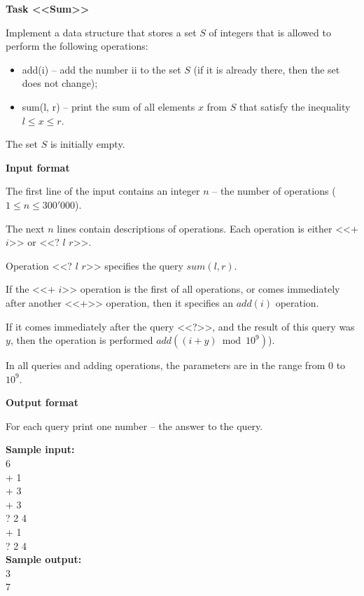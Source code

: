 \documentclass[a4paper]{article}
\begin{document}
\textbf{Task <<Sum>>}

Implement a data structure that stores a set $S$ of integers that is allowed to perform the following operations:
\begin{itemize}
\item add(i) -- add the number ii to the set $S$ (if it is already there, then the set does not change);
\item sum(l, r) -- print the sum of all elements $x$ from $S$ that satisfy the inequality $l \le x \le r$.
\end{itemize}

The set $S$ is initially empty.

\SPACE

\textbf{Input format}

The first line of the input contains an integer $n$ -- the number of operations ($1 \le n \le 300'000$).

The next $n$ lines contain descriptions of operations. Each operation is either <<+ $i$>> or <<? $l$ $r$>>.

Operation <<? $l$ $r$>> specifies the query $sum(l, r)$.

If the <<+ $i$>> operation is the first of all operations, or comes immediately after another <<+>> operation, then it specifies an $add(i)$ operation.

If it comes immediately after the query <<?>>, and the result of this query was $y$, then the operation is performed $add ((i + y) \bmod 10^9)$).

In all queries and adding operations, the parameters are in the range from $0$ to $10^9$.

\SPACE

\textbf{Output format}

For each query print one number -- the answer to the query.

\LINE

\noindent \textbf{Sample input:}\\
6\\
+ 1\\
+ 3\\
+ 3\\
? 2 4\\
+ 1\\
? 2 4\\

\noindent \textbf{Sample output:}\\
3\\
7\\
\end{document}

